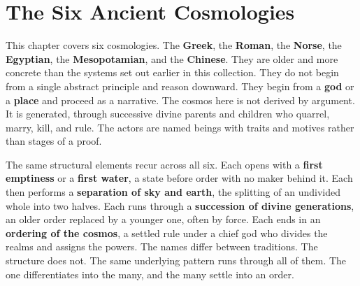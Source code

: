 \chapter{The Six Ancient Cosmologies}

This chapter covers six cosmologies. The \textbf{Greek}, the \textbf{Roman}, the
\textbf{Norse}, the \textbf{Egyptian}, the \textbf{Mesopotamian}, and the
\textbf{Chinese}. They are older and more concrete than the systems set out
earlier in this collection. They do not begin from a single abstract principle
and reason downward. They begin from a \textbf{god} or a \textbf{place} and
proceed as a narrative. The cosmos here is not derived by argument. It is
generated, through successive divine parents and children who quarrel, marry,
kill, and rule. The actors are named beings with traits and motives rather than
stages of a proof.

The same structural elements recur across all six. Each opens with a
\textbf{first emptiness} or a \textbf{first water}, a state before order with no
maker behind it. Each then performs a \textbf{separation of sky and earth}, the
splitting of an undivided whole into two halves. Each runs through a
\textbf{succession of divine generations}, an older order replaced by a younger
one, often by force. Each ends in an \textbf{ordering of the cosmos}, a settled
rule under a chief god who divides the realms and assigns the powers. The names
differ between traditions. The structure does not. The same underlying pattern
runs through all of them. The one differentiates into the many, and the many
settle into an order.
